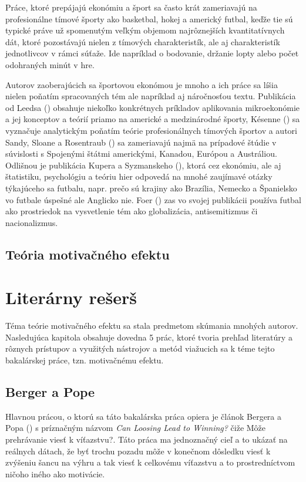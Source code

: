 \documentclass[
  digital, %
  oneside, %
  notable,   %
  lof,     %
  lot,     %
]{fithesis3}
\begin{document}
	Práce, ktoré prepájajú ekonómiu a šport sa často krát zameriavajú na profesionálne tímové športy ako basketbal, hokej a americký futbal, keďže tie sú typické práve už spomenutým veľkým objemom najrôznejších kvantitatívnych dát, ktoré pozostávajú nielen z tímových charakteristík, ale aj charakteristík jednotlivcov v rámci súťaže. Ide napríklad o bodovanie, držanie lopty alebo počet odohraných minút v hre.
	
	Autorov zaoberajúcich sa športovou ekonómou je mnoho a ich práce sa líšia nielen poňatím spracovaných tém ale napríklad aj náročnosťou textu. Publikácia od Leedsa (\citeyear{leeds2018}) obsahuje niekoľko konkrétnych príkladov aplikovania mikroekonómie a jej konceptov a teórií priamo na americké a medzinárodné športy, Késenne (\citeyear{kesenne2014}) sa vyznačuje analytickým poňatím teórie profesionálnych tímových športov a autori Sandy, Sloane a Rosentraub (\citeyear{sandy2004}) sa zameriavajú najmä na prípadové štúdie v súvislosti s Spojenými štátmi americkými, Kanadou, Európou a Austráliou. Odlišnou je publikácia Kupera a Syzmanskeho (\citeyear{kuper2009}), ktorá cez ekonómiu, ale aj štatistiku, psychológiu a teóriu hier odpovedá na mnohé zaujímavé otázky týkajúceho sa futbalu, napr. prečo sú krajiny ako Brazília, Nemecko a Španielsko vo futbale úspešné ale Anglicko nie. Foer (\citeyear{foer2004}) zas vo svojej publikácii používa futbal ako prostriedok na vysvetlenie tém ako globalizácia, antisemitizmus či nacionalizmus.
		\section{Teória motivačného efektu}

	\chapter{Literárny rešerš}
	Téma teórie motivačného efektu sa stala predmetom skúmania mnohých autorov. Nasledujúca kapitola obsahuje dovedna 5 prác, ktoré tvoria prehľad literatúry a rôznych prístupov a využitých nástrojov a metód viažucich sa k téme tejto bakalárskej práce, tzn. motivačnému efektu. 
	
		\section{Berger a Pope}
		\label{sec:Berger}
		Hlavnou prácou, o ktorú sa táto bakalárska práca opiera je článok Bergera a Popa (\citeyear{berger2011}) s príznačným názvom \textit{Can Loosing Lead to Winning?} čiže Môže prehrávanie viesť k víťazstvu?. Táto práca ma jednoznačný cieľ a to ukázať na reálnych dátach, že byť trochu pozadu môže v konečnom dôsledku viesť k zvýšeniu šancu na výhru a tak viesť k celkovému víťazstvu a to prostredníctvom ničoho iného ako motivácie.
		
\end{document}
